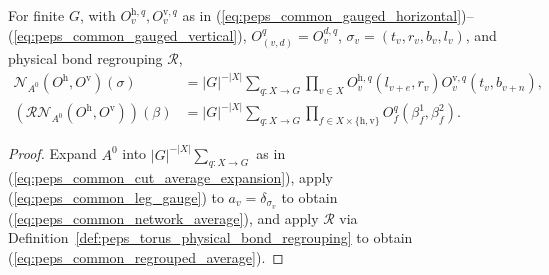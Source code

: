 \begin{lemma}%
    \label{thm:peps_four_cut_common_network_expansion}
    \leanok
    For finite $G$, with $O^{\mathrm h,q}_v,O^{\mathrm v,q}_v$ as in
    (\ref{eq:peps_common_gauged_horizontal})--(\ref{eq:peps_common_gauged_vertical}),
    $O^q_{(v,d)}=O^{d,q}_v$, $\sigma_v=(t_v,r_v,b_v,l_v)$, and physical bond
    regrouping $\mathcal R$,
    \begin{align}
        \mathcal N_{A^0}(O^{\mathrm h},O^{\mathrm v})(\sigma)
         & =|G|^{-|X|}\sum_{q:X\to G}\prod_{v\in X}
        O^{\mathrm h,q}_v(l_{v+e},r_v)
        O^{\mathrm v,q}_v(t_v,b_{v+n}),
        \label{eq:peps_common_network_average}                                   \\
        (\mathcal R\mathcal N_{A^0}(O^{\mathrm h},O^{\mathrm v}))(\beta)
         & =|G|^{-|X|}\sum_{q:X\to G}\prod_{f\in X\times\{\mathrm h,\mathrm v\}}
        O^q_f(\beta_f^1,\beta_f^2).
        \label{eq:peps_common_regrouped_average}
    \end{align}
\end{lemma}
\begin{proof}\leanok
    Expand $A^0$ into $|G|^{-|X|}\sum_{q:X\to G}$ as in
    (\ref{eq:peps_common_cut_average_expansion}), apply
    (\ref{eq:peps_common_leg_gauge}) to $a_v=\delta_{\sigma_v}$ to obtain
    (\ref{eq:peps_common_network_average}), and apply $\mathcal R$ via
    Definition~\ref{def:peps_torus_physical_bond_regrouping} to obtain
    (\ref{eq:peps_common_regrouped_average}).
\end{proof}
